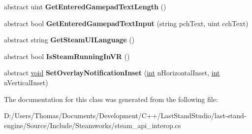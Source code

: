 \begin{DoxyCompactItemize}
\item 
\hypertarget{classValve_1_1Steamworks_1_1ISteamUtils_a32f6bdab024a937a430326670f9cc959}{}abstract uint {\bfseries Get\+Entered\+Gamepad\+Text\+Length} ()\label{classValve_1_1Steamworks_1_1ISteamUtils_a32f6bdab024a937a430326670f9cc959}

\item 
\hypertarget{classValve_1_1Steamworks_1_1ISteamUtils_a384a26e2058a4c6c601b4242c1d37e37}{}abstract bool {\bfseries Get\+Entered\+Gamepad\+Text\+Input} (string pch\+Text, uint cch\+Text)\label{classValve_1_1Steamworks_1_1ISteamUtils_a384a26e2058a4c6c601b4242c1d37e37}

\item 
\hypertarget{classValve_1_1Steamworks_1_1ISteamUtils_aab08a9dafb2eaafc19756f499768eb55}{}abstract string {\bfseries Get\+Steam\+U\+I\+Language} ()\label{classValve_1_1Steamworks_1_1ISteamUtils_aab08a9dafb2eaafc19756f499768eb55}

\item 
\hypertarget{classValve_1_1Steamworks_1_1ISteamUtils_a75be4590bdae3d262578a611a1a8430f}{}abstract bool {\bfseries Is\+Steam\+Running\+In\+V\+R} ()\label{classValve_1_1Steamworks_1_1ISteamUtils_a75be4590bdae3d262578a611a1a8430f}

\item 
\hypertarget{classValve_1_1Steamworks_1_1ISteamUtils_af80a5dc8cc523a44d3dffb3e5a67bd1f}{}abstract \hyperlink{SDL__audio_8h_a52835ae37c4bb905b903cbaf5d04b05f}{void} {\bfseries Set\+Overlay\+Notification\+Inset} (\hyperlink{SDL__thread_8h_a6a64f9be4433e4de6e2f2f548cf3c08e}{int} n\+Horizontal\+Inset, \hyperlink{SDL__thread_8h_a6a64f9be4433e4de6e2f2f548cf3c08e}{int} n\+Vertical\+Inset)\label{classValve_1_1Steamworks_1_1ISteamUtils_af80a5dc8cc523a44d3dffb3e5a67bd1f}

\end{DoxyCompactItemize}


The documentation for this class was generated from the following file\+:\begin{DoxyCompactItemize}
\item 
D\+:/\+Users/\+Thomas/\+Documents/\+Development/\+C++/\+Last\+Stand\+Studio/last-\/stand-\/engine/\+Source/\+Include/\+Steamworks/steam\+\_\+api\+\_\+interop.\+cs\end{DoxyCompactItemize}
